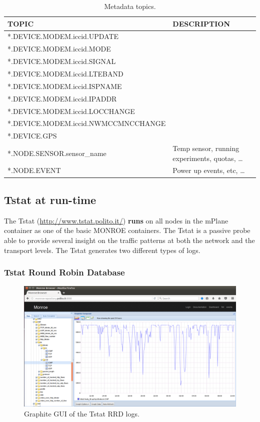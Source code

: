\documentclass[a4paper,10pt]{article}
\begin{document}
\begin{table}[tp]
	\caption{Metadata topics.}\label{tab:metadataTopics}
	\begin{center}
	\begin{tabular}{ll}
		\toprule
		\textbf{TOPIC} & \textbf{DESCRIPTION} \\
		\midrule
		*.DEVICE.MODEM.iccid.UPDATE	& \\
		*.DEVICE.MODEM.iccid.MODE & \\
		*.DEVICE.MODEM.iccid.SIGNAL	& \\
		*.DEVICE.MODEM.iccid.LTEBAND	& \\
		*.DEVICE.MODEM.iccid.ISPNAME	& \\
		*.DEVICE.MODEM.iccid.IPADDR	& \\
		*.DEVICE.MODEM.iccid.LOCCHANGE	& \\
		*.DEVICE.MODEM.iccid.NWMCCMNCCHANGE	& \\
		*.DEVICE.GPS	& \\
		*.NODE.SENSOR.sensor\_name & Temp sensor, running experiments, quotas, \ldots \\
		*.NODE.EVENT & Power up events, etc, \ldots \\
		\bottomrule
	\end{tabular}
	\end{center}
\end{table}

\subsection{Tstat at run-time}
\label{subsec:tsattRunTime}
The Tstat (\url{http://www.tstat.polito.it/}) \textbf{runs} on all nodes in the mPlane container as one of the basic MONROE containers. The Tstat is a passive probe able to provide several insight on the traffic patterns at both the network and the transport levels. The Tstat generates two different types of logs. 

\subsubsection{Tstat Round Robin Database}

\begin{figure}[h]
	\centering
	\includegraphics[width=1\textwidth]{TstatRRDGUI.png}
	\caption{Graphite GUI of the Tstat RRD logs.}
	\label{fig:TstatRRDGUI}
\end{figure}
\end{document}
